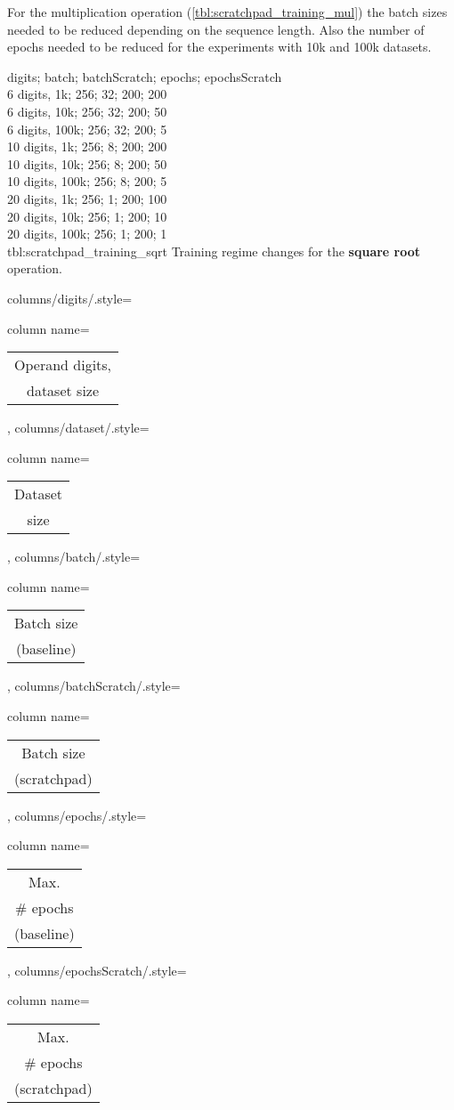 For the multiplication operation (\cref{tbl:scratchpad_training_mul}) the batch sizes needed to be reduced depending on the sequence length. Also the number of epochs needed to be reduced for the experiments with 10k and 100k datasets.

{
    digits; batch; batchScratch; epochs; epochsScratch\\
    6 digits,  1k;  256; 32; 200; 200\\
    6 digits,  10k;  256; 32; 200; 50\\
    6 digits,  100k;  256; 32; 200; 5\\
    10 digits,  1k;  256; 8; 200; 200\\
    10 digits,  10k;  256; 8; 200; 50\\
    10 digits,  100k;  256; 8; 200; 5\\
    20 digits,  1k;  256; 1; 200; 100\\
    20 digits,  10k;  256; 1; 200; 10\\
    20 digits,  100k;  256; 1; 200; 1\\
}
{tbl:scratchpad_training_sqrt}
{
    Training regime changes for the \textbf{square root} operation.
}
{%
    columns/digits/.style={column name={\begin{tabular}{c}
         Operand digits, \\
         dataset size
    \end{tabular}}},
    columns/dataset/.style={column name={\begin{tabular}{c}
         Dataset \\
         size
    \end{tabular}}},
    columns/batch/.style={column name={\begin{tabular}{c}
         Batch size \\
         (baseline)
    \end{tabular}}},
    columns/batchScratch/.style={column name={\begin{tabular}{c}
         Batch size \\
         (scratchpad)
    \end{tabular}}},
    columns/epochs/.style={column name={\begin{tabular}{c}
         Max. \\
         \# epochs \\
         (baseline)
    \end{tabular}}},
    columns/epochsScratch/.style={column name={\begin{tabular}{c}
         Max. \\
         \# epochs \\
         (scratchpad)
    \end{tabular}}}
}

